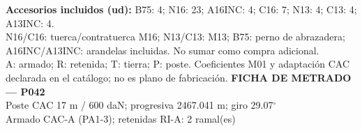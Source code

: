 \begingroup\scriptsize
\textbf{Accesorios incluidos (ud):} B75: 4; N16: 23; A16INC: 4; C16: 7; N13: 4; C13: 4; A13INC: 4.\\
N16/C16: tuerca/contratuerca M16; N13/C13: M13; B75: perno de abrazadera; A16INC/A13INC: arandelas incluidas. No sumar como compra adicional.\\
A: armado; R: retenida; T: tierra; P: poste. Coeficientes M01 y adaptación CAC declarada en el catálogo; no es plano de fabricación.
\endgroup\endgroup
\clearpage{}
\begingroup\small\setlength{\parskip}{3pt}\renewcommand{\arraystretch}{1.05}
\textbf{\large FICHA DE METRADO — P042}\\[4pt]
Poste CAC 17 m / 600 daN; progresiva 2467.041 m; giro 29.07\ensuremath{^\circ}\\
Armado CAC-A (PA1-3); retenidas RI-A: 2 ramal(es)\\
\begingroup\scriptsize
